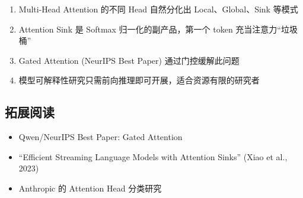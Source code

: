 \documentclass[a4paper]{article}
\begin{document}
\begin{enumerate}
  \item Multi-Head Attention 的不同 Head 自然分化出 Local、Global、Sink 等模式
  \item Attention Sink 是 Softmax 归一化的副产品，第一个 token 充当注意力``垃圾桶''
  \item Gated Attention (NeurIPS Best Paper) 通过门控缓解此问题
  \item 模型可解释性研究只需前向推理即可开展，适合资源有限的研究者
\end{enumerate}

\subsection{拓展阅读}
\begin{itemize}
  \item Qwen/NeurIPS Best Paper: Gated Attention
  \item ``Efficient Streaming Language Models with Attention Sinks'' (Xiao et al., 2023)
  \item Anthropic 的 Attention Head 分类研究
\end{itemize}
\end{document}
